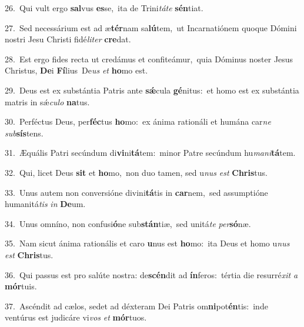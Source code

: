 {\numbfont\textcolor{\numbcolor}{26.}}~Qui vult ergo \textbf{sal}\-vus \textbf{es}\-se,~\star ita de Trini\-\textit{tá}\-\textit{te} \textbf{sén}\-tiat.\par
{\numbfont\textcolor{\numbcolor}{27.}}~Sed necessárium est ad æ\-\textbf{tér}\-nam sa\-\textbf{lú}\-tem,~\star ut Incarnatiónem quoque Dómini nostri Jesu Christi fidé\-\textit{li}\-\textit{ter} \textbf{cre}\-dat.\par
{\numbfont\textcolor{\numbcolor}{28.}}~Est ergo fides recta ut credámus et confiteámur,~\dagger quia Dóminus noster Jesus Christus, \textbf{De}\-i \textbf{Fí}\-lius~\star De\textit{us} \textit{et} \textbf{ho}\-mo est.\par
{\numbfont\textcolor{\numbcolor}{29.}}~Deus est ex substántia Patris ante \textbf{sǽ}\-cula \textbf{gé}\-nitus:~\star et homo est ex substántia matris in sǽ\-\textit{cu}\-\textit{lo} \textbf{na}\-tus.\par
{\numbfont\textcolor{\numbcolor}{30.}}~Perféctus Deus, per\-\textbf{féc}\-tus \textbf{ho}\-mo:~\star ex ánima rationáli et humána car\textit{ne} \textit{sub}\-\textbf{sís}tens.\par
{\numbfont\textcolor{\numbcolor}{31.}}~Æquális Patri secúndum di\-\textbf{vi}\-ni\-\textbf{tá}\-tem:~\star minor Patre secúndum hu\-\textit{ma}\-\textit{ni}\textbf{tá}tem.\par
{\numbfont\textcolor{\numbcolor}{32.}}~Qui, licet Deus \textbf{sit} et \textbf{ho}\-mo,~\star non duo tamen, sed u\textit{nus} \textit{est} \textbf{Chris}\-tus.\par
{\numbfont\textcolor{\numbcolor}{33.}}~Unus autem non conversióne divini\-\textbf{tá}\-tis in \textbf{car}\-nem,~\star sed assumptióne humanitá\textit{tis} \textit{in} \textbf{De}\-um.\par
{\numbfont\textcolor{\numbcolor}{34.}}~Unus omníno, non confusi\-\textbf{ó}\-ne sub\-\textbf{stán}\-tiæ,~\star sed unitá\textit{te} \textit{per}\-\textbf{só}næ.\par
{\numbfont\textcolor{\numbcolor}{35.}}~Nam sicut ánima rationális et caro \textbf{u}\-nus est \textbf{ho}\-mo:~\star ita Deus et homo u\textit{nus} \textit{est} \textbf{Chris}\-tus.\par
{\numbfont\textcolor{\numbcolor}{36.}}~Qui passus est pro salúte nostra: de\-\textbf{scén}\-dit ad \textbf{ín}\-feros:~\star tértia die resurré\textit{xit} \textit{a} \textbf{mór}\-tuis.\par
{\numbfont\textcolor{\numbcolor}{37.}}~Ascéndit ad cælos, sedet ad déxteram Dei Patris om\-\textbf{ni}\-pot\-\textbf{én}\-tis:~\star inde ventúrus est judicáre vi\textit{vos} \textit{et} \textbf{mór}\-tuos.\par
